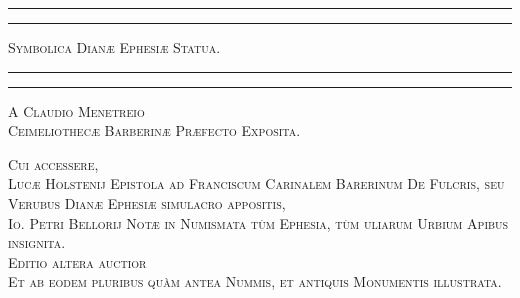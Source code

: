 \documentclass[a4paper, 11pt, oneside, polutonikogreek, latin]{article}
\begin{document}
\begin{titlepage} %
	\centering %

	
	\rule{\textwidth}{1.6pt}\vspace*{-\baselineskip}\vspace*{2pt} %
	\rule{\textwidth}{0.4pt} %
	
	\vspace{1\baselineskip} %
	
	{\scshape\Huge Symbolica Dianæ Ephesiæ Statua.}
	
	\vspace{1\baselineskip} %

	\rule{\textwidth}{0.4pt}\vspace*{-\baselineskip}\vspace{3.2pt} %
	\rule{\textwidth}{1.6pt} %
	
	\vspace{1\baselineskip} %
	
	
	{\scshape \Large A Claudio Menetreio\\Ceimeliothecæ Barberinæ Præfecto Exposita.} %
	
	\vspace*{1\baselineskip} %
	
{\scshape Cui accessere,\\Lucæ Holstenij Epistola ad Franciscum Carinalem Barerinum De Fulcris, seu Verubus Dianæ Ephesiæ simulacro appositis,\\Io. Petri Bellorij Notæ in Numismata tùm Ephesia, tùm uliarum Urbium Apibus insignita.\\\vspace*{10mm}\small Editio altera auctior\\Et ab eodem pluribus quàm antea Nummis, et antiquis Monumentis illustrata.} %

\vspace*{\fill}


\end{titlepage}
\end{document}
